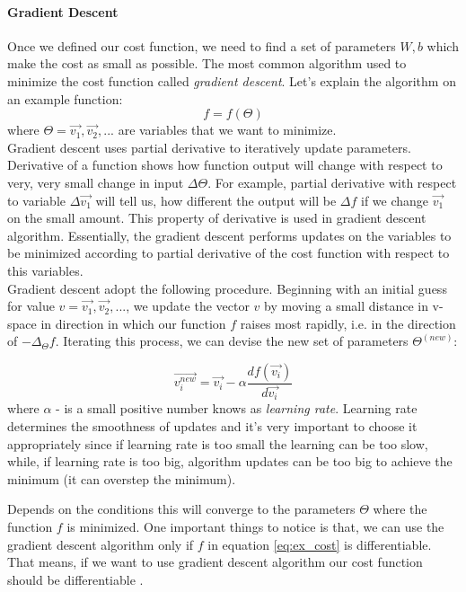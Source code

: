 \paragraph{Gradient Descent} \label{par:grad_desc}Once we defined our cost function, we need to find
a set of parameters $W, b$ which make the cost as small as possible. The most common
algorithm used to minimize the cost function called \emph{gradient descent}.
Let's explain the algorithm on an example function:
\begin{equation} \label{eq:ex_cost}
	f = f(\Theta)
\end{equation}
where $\Theta = \vec{v_1}, \vec{v_2},...$ are variables that we want to minimize.
\\
Gradient descent uses partial derivative
to iteratively update parameters. Derivative of a function shows how function output
will change with respect to very, very small change in input $\Delta \Theta $.
For example, partial derivative with respect to variable $\Delta{\vec{v_1}}$ will tell us, how different
the output will be $\Delta f $ if we change $\vec{v_1}$ on the small amount.
This property of derivative is used in gradient descent algorithm.
Essentially, the gradient descent
performs updates on the variables to be minimized according to partial derivative of the
cost function with respect to this variables. \\
Gradient descent adopt the following procedure.
Beginning with an initial guess for value $v= \vec{v_1}, \vec{v_2}, ...$, we update the vector $v$
by moving a small distance in v-space in direction in which our function $f$ raises
most rapidly, i.e. in the direction of $- \Delta_{\Theta} f $. Iterating this process,
we can devise the new set of parameters $\Theta^{(new)}$:

\begin{equation} \label{eq:gd_update}
	\vec{v_i^{new}} = \vec{v_i} - \alpha \frac{df(\vec{v_i})}{d\vec{v_i}}
\end{equation}
where $\alpha$ - is a small positive number knows as \emph{learning rate}.
Learning rate determines the smoothness of updates and it's very important to choose
it appropriately since if learning rate is too small the learning can be too slow, while, if
learning rate is too big, algorithm updates can be too big to achieve the minimum
(it can overstep the minimum).

Depends on the conditions this will converge to the parameters $\Theta$ where the function
$f$ is minimized.
One important things to notice is that, we can use the gradient descent algorithm only
if $f$ in equation \ref{eq:ex_cost} is differentiable. That means, if we want
to use gradient descent algorithm our cost function should
be differentiable \cite{Bishop1995}.

